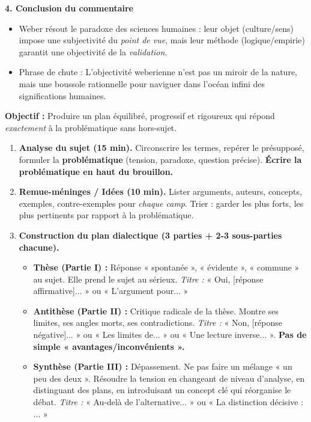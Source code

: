 \documentclass[11pt]{article}
\begin{document}
\begin{exoresolu}
    \textbf{4. Conclusion du commentaire}
    \begin{itemize}
        \item Weber résout le paradoxe des sciences humaines : leur objet (culture/sens) impose une subjectivité du \emph{point de vue}, mais leur méthode (logique/empirie) garantit une objectivité de la \emph{validation}.
        \item Phrase de chute : \guillemotleft L'objectivité weberienne n'est pas un miroir de la nature, mais une boussole rationnelle pour naviguer dans l'océan infini des significations humaines. \guillemotright
    \end{itemize}
\end{exoresolu}

\begin{methode}
    \textbf{Objectif :} Produire un plan équilibré, progressif et rigoureux qui répond \emph{exactement} à la problématique sans hors-sujet.
    \begin{enumerate}
        \item \textbf{Analyse du sujet (15 min).} Circonscrire les termes, repérer le présupposé, formuler la \textbf{problématique} (tension, paradoxe, question précise). \textbf{Écrire la problématique en haut du brouillon.}
        \item \textbf{Remue-méninges / Idées (10 min).} Lister arguments, auteurs, concepts, exemples, contre-exemples pour \emph{chaque camp}. Trier : garder les plus forts, les plus pertinents par rapport à la problématique.
        \item \textbf{Construction du plan dialectique (3 parties + 2-3 sous-parties chacune).}
        \begin{itemize}
            \item \textbf{Thèse (Partie I) :} Réponse « spontanée », « évidente », « commune » au sujet. Elle prend le sujet au sérieux. \emph{Titre :} « Oui, [réponse affirmative]... » ou « L'argument pour... »
            \item \textbf{Antithèse (Partie II) :} Critique radicale de la thèse. Montre ses limites, ses angles morts, ses contradictions. \emph{Titre :} « Non, [réponse négative]... » ou « Les limites de... » ou « Une lecture inverse... ». \textbf{Pas de simple « avantages/inconvénients ».}
            \item \textbf{Synthèse (Partie III) :} Dépassement. Ne pas faire un mélange « un peu des deux ». Résoudre la tension en changeant de niveau d'analyse, en distinguant des plans, en introduisant un concept clé qui réorganise le débat. \emph{Titre :} « Au-delà de l'alternative... » ou « La distinction décisive : ... »

\end{itemize}
\end{enumerate}
\end{methode}
\end{document}
